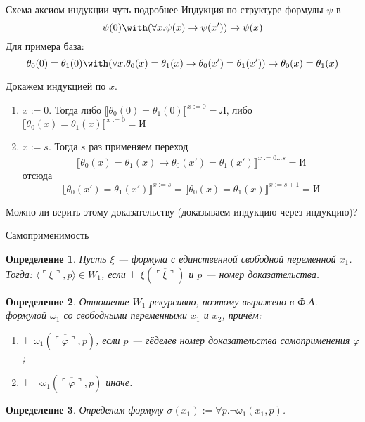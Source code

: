 \documentclass[aspectratio=169]{beamer}
\newtheorem{dfn}{Определение}[section]
\begin{document}
\begin{frame}{Схема аксиом индукции чуть подробнее}
Индукция по структуре формулы $\psi$ в $$\psi(0) \with (\forall x.\psi(x) \rightarrow \psi(x')) \rightarrow \psi(x)$$
Для примера база: $$\theta_0(0) = \theta_1(0) \with (\forall x.\theta_0(x) = \theta_1(x) \rightarrow \theta_0(x') = \theta_1(x')) \rightarrow \theta_0(x) = \theta_1(x)$$

Докажем индукцией по $x$.
\begin{enumerate}
\item $x := 0$. Тогда либо $\llbracket \theta_0(0) = \theta_1(0) \rrbracket^{x := 0} = \text{Л}$, 
либо $\llbracket \theta_0(x) = \theta_1(x) \rrbracket^{x := 0} = \text{И}$
\item $x := s$. Тогда $s$ раз применяем переход $$\llbracket \theta_0(x) = \theta_1(x) \rightarrow \theta_0(x') = \theta_1(x') \rrbracket^{x := \overline{0\dots s}} = \text{И}$$
отсюда $$\llbracket\theta_0(x') = \theta_1(x') \rrbracket^{x := s} = \llbracket\theta_0(x) = \theta_1(x) \rrbracket^{x := s+1} = \text{И}$$
\end{enumerate}

\pause
Можно ли верить этому доказательству (доказываем индукцию через индукцию)?
\end{frame}

\begin{frame}{Самоприменимость}
\begin{dfn}Пусть $\xi$ --- формула с единственной свободной
переменной $x_1$. Тогда:
$\langle\ulcorner \xi \urcorner,p\rangle \in W_1$, если $\vdash \xi(\overline{\ulcorner \xi \urcorner})$ и $p$ --- номер доказательства.
\end{dfn}

\begin{dfn}Отношение $W_1$ рекурсивно, поэтому выражено в Ф.А. формулой $\omega_1$ со свободными переменными $x_1$ и $x_2$, причём:
\begin{enumerate}
\item $\vdash \omega_1(\overline{\ulcorner \varphi \urcorner},\overline{p})$, если $p$ --- гёделев номер
доказательства самоприменения $\varphi$;
\item $\vdash \neg\omega_1(\overline{\ulcorner \varphi \urcorner},\overline{p})$ иначе.
\end{enumerate}
\end{dfn}

\begin{dfn}
Определим формулу $\sigma(x_1) := \forall p.\neg\omega_1(x_1,p)$. 
\end{dfn}
\end{frame}
\end{document}
